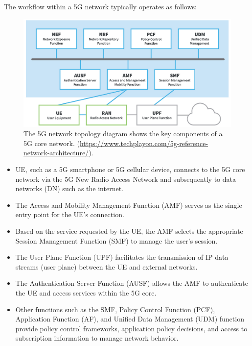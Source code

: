 \documentclass[sigplan,screen]{acmart}
\begin{document}
The workflow within a 5G network typically operates as follows:

\begin{figure}[htbp]
\centering
\includegraphics[width=\linewidth]{5gArchitecture.jpg}
\caption{The 5G network topology diagram shows the key components of a 5G core network. (\url{https://www.techplayon.com/5g-reference-network-architecture/}).}
\end{figure}

\begin{itemize}
\item UE, such as a 5G smartphone or 5G cellular device, connects to the 5G core network via the 5G New Radio Access Network and subsequently to data networks (DN) such as the internet.
\item The Access and Mobility Management Function (AMF) serves as the single entry point for the UE's connection. 
\item  Based on the service requested by the UE, the AMF selects the appropriate Session Management Function (SMF) to manage the user's session.
\item The User Plane Function (UPF) facilitates the transmission of IP data streams (user plane) between the UE and external networks.
\item The Authentication Server Function (AUSF) allows the AMF to authenticate the UE and access services within the 5G core.
\item Other functions such as the SMF, Policy Control Function (PCF), Application Function (AF), and Unified Data Management (UDM) function provide policy control frameworks, application policy decisions, and access to subscription information to manage network behavior.
\end{itemize}
\end{document}
